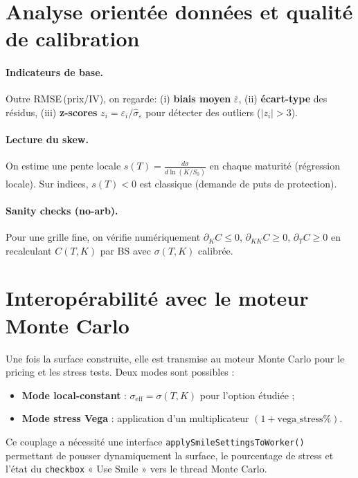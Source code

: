 \documentclass[11pt,a4paper]{article}
\begin{document}
\section{Analyse orientée données et qualité de calibration \label{sec:qc-data}}
\paragraph{Indicateurs de base.}
Outre RMSE\,(prix/IV), on regarde: (i) \textbf{biais moyen} $\overline{\varepsilon}$, 
(ii) \textbf{écart-type} des résidus, (iii) \textbf{z-scores} $z_i=\varepsilon_i/\widehat{\sigma}_\varepsilon$ 
pour détecter des outliers ($|z_i|>3$).

\paragraph{Lecture du skew.}
On estime une pente locale $s(T)=\tfrac{d\sigma}{d\ln(K/S_0)}$ en chaque maturité (régression locale).
Sur indices, $s(T)<0$ est classique (demande de puts de protection).

\paragraph{Sanity checks (no-arb).}
Pour une grille fine, on vérifie numériquement $\partial_K C\le 0$, $\partial_{KK}C\ge 0$, $\partial_T C\ge 0$
en recalculant $C(T,K)$ par BS avec $\sigma(T,K)$ calibrée.


\section{Interopérabilité avec le moteur Monte Carlo}
Une fois la surface construite, elle est transmise au moteur Monte Carlo pour le pricing et les stress tests.  
Deux modes sont possibles :
\begin{itemize}
  \item \textbf{Mode local-constant} : $\sigma_{\text{eff}} = \sigma(T,K)$ pour l’option étudiée ;
  \item \textbf{Mode stress Vega} : application d’un multiplicateur $(1+\text{vega\_stress}\%)$.
\end{itemize}

Ce couplage a nécessité une interface \texttt{applySmileSettingsToWorker()} permettant de pousser dynamiquement la surface, le pourcentage de stress et l’état du \texttt{checkbox} « Use Smile » vers le thread Monte Carlo.
\end{document}
